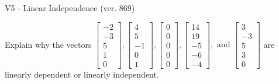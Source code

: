 \begin{exercise}
  \begin{exerciseTitle}V5 - Linear Independence (ver. 869)\end{exerciseTitle}
  \begin{exerciseStatement}
    Explain why the vectors \(\left[\begin{array}{r}
-2 \\
-3 \\
5 \\
1 \\
0
\end{array}\right] , \left[\begin{array}{r}
4 \\
5 \\
-1 \\
0 \\
1
\end{array}\right] , \left[\begin{array}{r}
0 \\
0 \\
0 \\
0 \\
0
\end{array}\right] , \left[\begin{array}{r}
14 \\
19 \\
-5 \\
-6 \\
-4
\end{array}\right] , \text{ and } \left[\begin{array}{r}
3 \\
-3 \\
5 \\
3 \\
0
\end{array}\right]\) are linearly dependent or linearly independent.	



\end{exerciseStatement}
\end{exercise}
